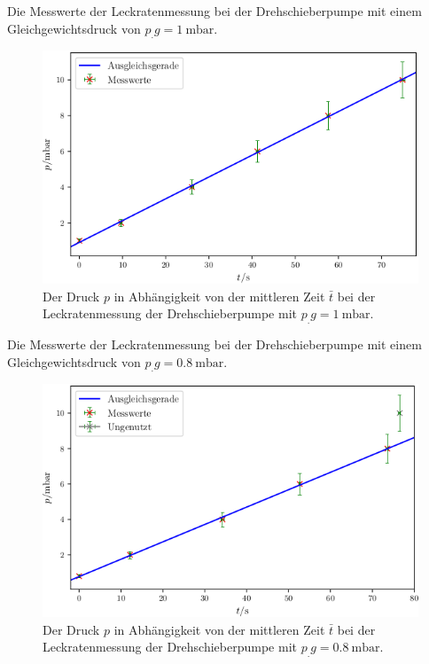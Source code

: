 \begin{table}
\centering
\caption{Die Messwerte der Leckratenmessung bei der Drehschieberpumpe mit einem Gleichgewichtsdruck von $p_.g = \SI{1}{\milli\bar}$.}

\label{tab:DL1}
\end{table}

\begin{figure}
\centering
\includegraphics[width=\linewidth-70pt,height=\textheight-70pt,keepaspectratio]{content/images/DL1.png}
\caption{Der Druck $p$ in Abhängigkeit von der mittleren Zeit $\bar{t}$ bei der Leckratenmessung der Drehschieberpumpe  mit $p_.g = \SI{1}{\milli\bar}$.}
\label{fig:DL1}
\end{figure}

\begin{table}
\centering
\caption{Die Messwerte der Leckratenmessung bei der Drehschieberpumpe mit einem Gleichgewichtsdruck von $p_.g = \SI{0.8}{\milli\bar}$.}

\label{tab:DL2}
\end{table}

\begin{figure}
\centering
\includegraphics[width=\linewidth-70pt,height=\textheight-70pt,keepaspectratio]{content/images/DL2.png}
\caption{Der Druck $p$ in Abhängigkeit von der mittleren Zeit $\bar{t}$ bei der Leckratenmessung der Drehschieberpumpe  mit $p_.g = \SI{0.8}{\milli\bar}$.}
\label{fig:DL2}
\end{figure}

